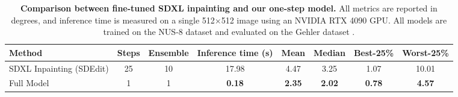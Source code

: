\begin{table*}[t]
\centering
\small
\caption{\textbf{Comparison between fine-tuned SDXL inpainting and our one-step model.} All metrics are reported in degrees, and inference time is measured on a single 512$\times$512 image using an NVIDIA RTX 4090 GPU. All models are trained on the NUS-8 dataset \cite{cheng2014illuminant} and evaluated on the Gehler dataset \cite{4587765}.}
\vspace{-3mm}
\label{tab:model-comparison}
\begin{tabular}{lccc|cccc}
\toprule
Method & Steps & Ensemble & Inference time (s) & Mean & Median & Best-25\% & Worst-25\% \\
\midrule
SDXL Inpainting (SDEdit) & 25 & 10 & 17.98 & 4.47 & 3.25 & 1.07 & 10.01\\
Full Model& 1 & 1 & \textbf{0.18} & \textbf{2.35} & \textbf{2.02} & \textbf{0.78} & \textbf{4.57} \\
\bottomrule
\end{tabular}
\end{table*}